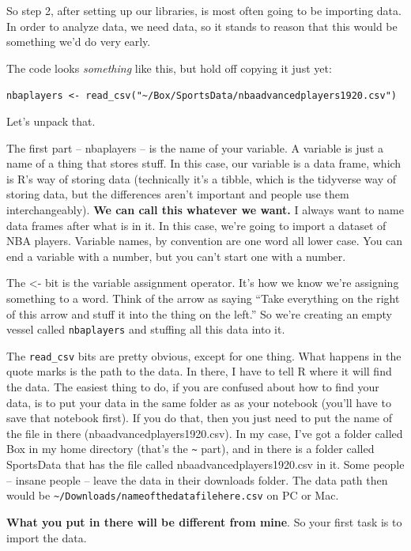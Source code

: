\documentclass[
  letterpaper,
  DIV=11,
  numbers=noendperiod]{scrreprt}
\begin{document}
So step 2, after setting up our libraries, is most often going to be
importing data. In order to analyze data, we need data, so it stands to
reason that this would be something we'd do very early.

The code looks \emph{something} like this, but hold off copying it just
yet:

\texttt{nbaplayers\ \textless{}-\ read\_csv("\textasciitilde{}/Box/SportsData/nbaadvancedplayers1920.csv")}

Let's unpack that.

The first part -- nbaplayers -- is the name of your variable. A variable
is just a name of a thing that stores stuff. In this case, our variable
is a data frame, which is R's way of storing data (technically it's a
tibble, which is the tidyverse way of storing data, but the differences
aren't important and people use them interchangeably). \textbf{We can
call this whatever we want.} I always want to name data frames after
what is in it. In this case, we're going to import a dataset of NBA
players. Variable names, by convention are one word all lower case. You
can end a variable with a number, but you can't start one with a number.

The \textless- bit is the variable assignment operator. It's how we know
we're assigning something to a word. Think of the arrow as saying ``Take
everything on the right of this arrow and stuff it into the thing on the
left.'' So we're creating an empty vessel called \texttt{nbaplayers} and
stuffing all this data into it.

The \texttt{read\_csv} bits are pretty obvious, except for one thing.
What happens in the quote marks is the path to the data. In there, I
have to tell R where it will find the data. The easiest thing to do, if
you are confused about how to find your data, is to put your data in the
same folder as as your notebook (you'll have to save that notebook
first). If you do that, then you just need to put the name of the file
in there (nbaadvancedplayers1920.csv). In my case, I've got a folder
called Box in my home directory (that's the \texttt{\textasciitilde{}}
part), and in there is a folder called SportsData that has the file
called nbaadvancedplayers1920.csv in it. Some people -- insane people --
leave the data in their downloads folder. The data path then would be
\texttt{\textasciitilde{}/Downloads/nameofthedatafilehere.csv} on PC or
Mac.

\textbf{What you put in there will be different from mine}. So your
first task is to import the data.
\end{document}

